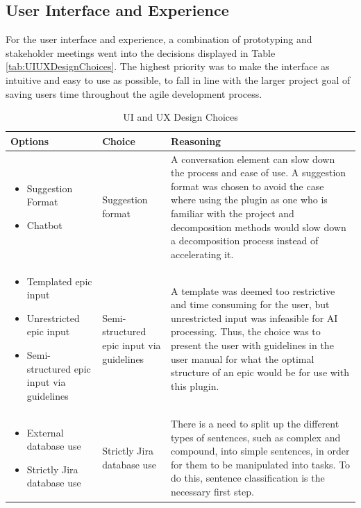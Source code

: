 \subsection{User Interface and Experience}
For the user interface and experience, a combination of prototyping and stakeholder meetings went into the decisions displayed in Table \ref{tab:UIUXDesignChoices}. The highest priority was to make the interface as intuitive and easy to use as possible, to fall in line with the larger project goal of saving users time throughout the agile development process.
\begin{table}[h]
	\caption{UI and UX Design Choices}
	\begin{tabularx}{\textwidth}{|p{3cm}|p{3cm}|X|}
	\hline
	Options & Choice & Reasoning\\
	\hline
	\begin{itemize}
		\item Suggestion Format
		\item Chatbot
	\end{itemize} &
	Suggestion format & A conversation element can slow down the process and ease of use. A suggestion format was chosen to avoid the case where using the plugin as one who is familiar with the project and decomposition methods would slow down a decomposition process instead of accelerating it.\\
	\hline
	\begin{itemize}
		\item Templated epic input
		\item Unrestricted epic input
		\item Semi-structured epic input via guidelines
	\end{itemize} &
	Semi-structured epic input via guidelines & A template was deemed too restrictive and time consuming for the user, but unrestricted input was infeasible for AI processing. Thus, the choice was to present the user with guidelines in the user manual for what the optimal structure of an epic would be for use with this plugin.\\
	\hline	
	\begin{itemize}
		\item External database use
		\item Strictly Jira database use
	\end{itemize} & 
	Strictly Jira database use & There is a need to split up the different types of sentences, such as complex and compound, into simple sentences, in order for them to be manipulated into tasks. To do this, sentence classification is the necessary first step.\\

\end{tabularx}
\end{table}
